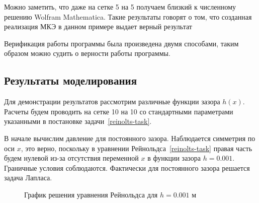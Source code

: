 \documentclass[a4paper,14pt]{extarticle}
\begin{document}
Можно заметить, что даже на сетке 5 на 5 получаем близкий к численному решению Wolfram Mathematica. Такие результаты говорят о том, что созданная реализация МКЭ в данном примере выдает верный результат

Верификация работы программы была произведена двумя способами, таким образом можно судить о верности работы программы.

\subsection{Результаты моделирования}

Для демонстрации результатов рассмотрим различные функции зазора $h(x)$.  Расчеты будем проводить на сетке 10 на 10 со стандартными параметрами указанными в постановке задачи~\eqref{reinolts-task}.

В начале вычислим давление для постоянного зазора. Наблюдается симметрия по оси $x$, это верно, поскольку в уравнении Рейнольдса~\eqref{reinolts-task} правая часть будем нулевой из-за отсутствия переменной $x$ в функции зазора $h = 0.001$. Граничные условия соблюдаются. Фактически для постоянного зазора решается задача Лапласа.
\begin{figure}[!htbp]
	\caption{График решения уравнения Рейнольдса для $h = 0.001$ м}
	\label{res_static}
\end{figure}
\end{document}
